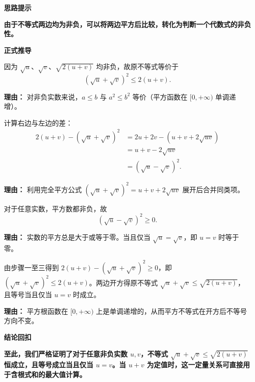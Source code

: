 \begin{proofbox}
	\textbf{\textcolor{CProof}{思路提示}}

	\textbf{由于不等式两边均为非负，可以将两边平方后比较，转化为判断一个代数式的非负性。}

	\medskip
	\textbf{\textcolor{CProof}{正式推导}}

	\begin{description}[style=nextline, leftmargin=2.8em, labelsep=0.5em, itemsep=0.55em]
		\item[\textbf{步骤一（平方转化）：}]
		      因为 $\sqrt{u}$、$\sqrt{v}$、$\sqrt{2(u+v)}$ 均非负，故原不等式等价于
		      \[
			      (\sqrt{u}+\sqrt{v})^2 \le 2(u+v).
		      \]
		      \par\textbf{理由：} 对非负实数来说，$a\le b$ 与 $a^2 \le b^2$ 等价（平方函数在 $[0,+\infty)$ 单调递增）。

		\item[\textbf{步骤二（作差变形）：}]
		      计算右边与左边的差：
		      \[
			      \begin{aligned}
				      2(u+v) - (\sqrt{u}+\sqrt{v})^2
				       & = 2u + 2v - (u + v + 2\sqrt{uv}) \\
				       & = u + v - 2\sqrt{uv}             \\
				       & = (\sqrt{u} - \sqrt{v})^2.
			      \end{aligned}
		      \]
		      \par\textbf{理由：} 利用完全平方公式 $(\sqrt{u}+\sqrt{v})^2 = u + v + 2\sqrt{uv}$ 展开后合并同类项。

		\item[\textbf{步骤三（非负判断）：}]
		      对于任意实数，平方数都非负，故
		      \[
			      (\sqrt{u} - \sqrt{v})^2 \ge 0.
		      \]
		      \par\textbf{理由：} 实数的平方总是大于或等于零。当且仅当 $\sqrt{u}=\sqrt{v}$，即 $u=v$ 时等于零。

		\item[\textbf{步骤四（回代结论）：}]
		      由步骤一至三得到 $2(u+v) - (\sqrt{u}+\sqrt{v})^2 \ge 0$，即 $(\sqrt{u}+\sqrt{v})^2 \le 2(u+v)$。两边开方得原不等式 $\sqrt{u}+\sqrt{v} \le \sqrt{2(u+v)}$，且等号当且仅当 $u=v$ 时成立。
		      \par\textbf{理由：} 平方根函数在 $[0,+\infty)$ 上是单调递增的，从而平方不等式在开方后不等号方向不变。
	\end{description}

	\medskip
	\textbf{\textcolor{CProof}{结论回扣}}

	\textbf{至此，我们严格证明了对于任意非负实数 $u,v$，不等式 $\sqrt{u}+\sqrt{v} \le \sqrt{2(u+v)}$ 恒成立，且等号成立当且仅当 $u=v$。当 $u+v$ 为定值时，这一定量关系可直接用于含根式和的最大值计算。}
\end{proofbox}